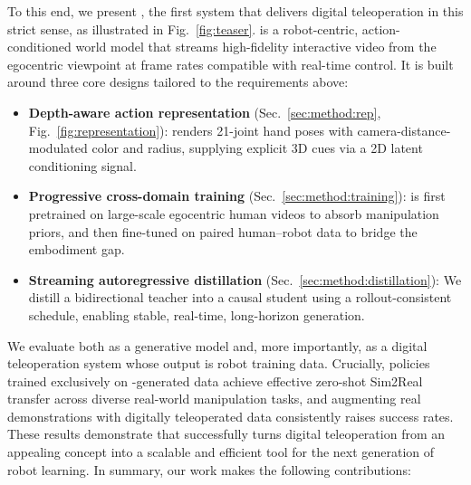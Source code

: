To this end, we present \textbf{\our}, the first system that delivers digital teleoperation in this strict sense, as illustrated in Fig.~\ref{fig:teaser}. \our is a robot-centric, action-conditioned world model that streams high-fidelity interactive video from the egocentric viewpoint at frame rates compatible with real-time control. It is built around three core designs tailored to the requirements above:
\begin{itemize}[nosep, labelsep=0.6em, leftmargin=1.2em,itemindent=0em]
\item \textbf{Depth-aware action representation} (Sec.~\ref{sec:method:rep}, Fig.~\ref{fig:representation}): \our renders 21-joint hand poses with camera-distance-modulated color and radius, supplying explicit 3D cues via a 2D latent conditioning signal.
\item \textbf{Progressive cross-domain training} (Sec.~\ref{sec:method:training}): \our is first pretrained on large-scale egocentric human videos to absorb manipulation priors, and then fine-tuned on paired human–robot data to bridge the embodiment gap.
\item \textbf{Streaming autoregressive distillation} (Sec.~\ref{sec:method:distillation}): We distill a bidirectional teacher into a causal student using a rollout-consistent schedule, enabling stable, real-time, long-horizon generation.
\end{itemize}
\noindent We evaluate \our both as a generative model and, more importantly, as a digital teleoperation system whose output is robot training data. Crucially, policies trained exclusively on \our-generated data achieve effective zero-shot Sim2Real transfer across diverse real-world manipulation tasks, and augmenting real demonstrations with digitally teleoperated data consistently raises success rates. These results demonstrate that \our successfully turns digital teleoperation from an appealing concept into a scalable and efficient tool for the next generation of robot learning.
In summary, our work makes the following contributions:
